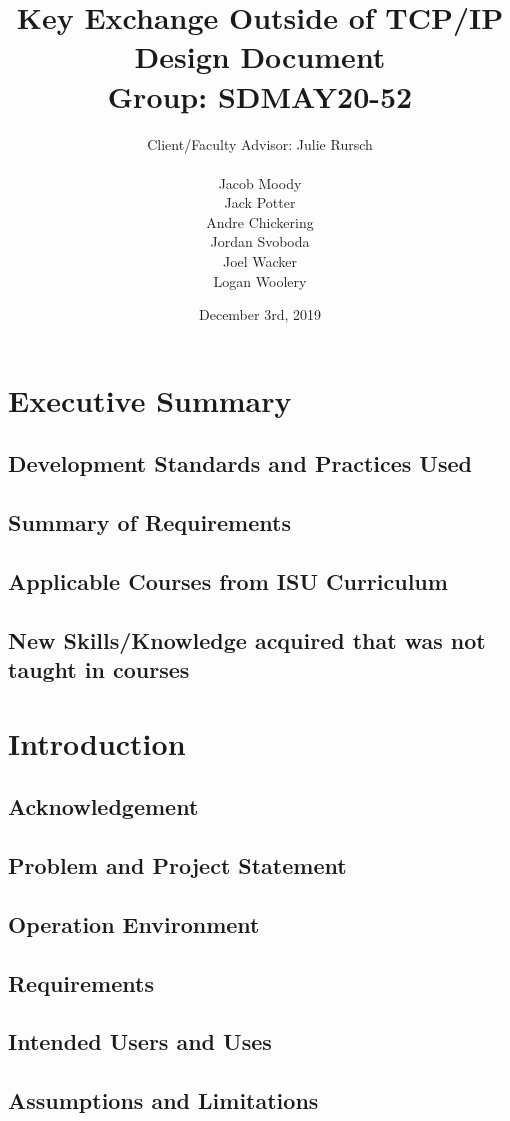 \documentclass[11pt]{article}
\title{\textbf{Key Exchange Outside of TCP/IP}\\ 
{\normalsize Design Document} \\
{\normalsize Group: SDMAY20-52}}
\author{Client/Faculty Advisor: Julie Rursch\\
\\
		Jacob Moody\\
		Jack Potter\\
		Andre Chickering\\
		Jordan Svoboda\\
		Joel Wacker\\
		Logan Woolery
}
\date{December 3rd, 2019}
\begin{document}
\maketitle
\newpage

\section*{Executive Summary}

\subsection*{Development Standards and Practices Used}
\subsection*{Summary of Requirements}
\subsection*{Applicable Courses from ISU Curriculum}
\subsection*{New Skills/Knowledge acquired that was not taught in courses}


\newpage
\tableofcontents
\newpage

\section{Introduction}
\subsection{Acknowledgement}
\subsection{Problem and Project Statement}
\subsection{Operation Environment}
\subsection{Requirements}
\subsection{Intended Users and Uses}
\subsection{Assumptions and Limitations}
\end{document}

